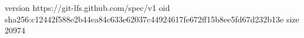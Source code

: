 version https://git-lfs.github.com/spec/v1
oid sha256:c12442f588e2b44ea84c633e62037c44924617fe672ff15b8ee5fd67d232b13e
size 20974
